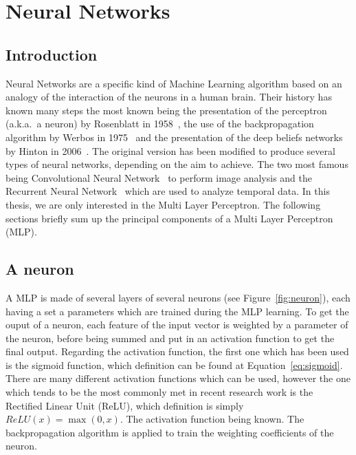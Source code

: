 \documentclass[a4paper]{report}
\begin{document}
\section{Neural Networks}
\label{sec:nn}

\subsection{Introduction}

Neural Networks are a specific kind of Machine Learning algorithm based on an analogy of the interaction of the neurons in a human brain. Their history has known many steps the most known being the presentation of the perceptron (a.k.a.\ a neuron) by Rosenblatt in 1958~\cite{rosenblatt1958perceptron}, the use of the backpropagation algorithm by Werbos in 1975~\cite{werbos1974beyond} and the presentation of the deep beliefs networks by Hinton in 2006~\cite{hinton2006fast}. The original version has been modified to produce several types of neural networks, depending on the aim to achieve. The two most famous being Convolutional Neural Network~\cite{krizhevsky2012imagenet} to perform image analysis and the Recurrent Neural Network~\cite{mikolov2010recurrent} which are used to analyze temporal data. In this thesis, we are only interested in the Multi Layer Perceptron. The following sections briefly sum up the principal components of a Multi Layer Perceptron (MLP). 

\subsection{A neuron}

A MLP is made of several layers of several neurons (see Figure~\ref{fig:neuron}), each having a set a parameters which are trained during the MLP learning. To get the ouput of a neuron, each feature of the input vector is weighted by a parameter of the neuron, before being summed and put in an activation function to get the final output. Regarding the activation function, the first one which has been used is the sigmoid function, which definition can be found at Equation~\ref{eq:sigmoid}. There are many different activation functions which can be used, however the one which tends to be the most commonly met in recent research work is the Rectified Linear Unit (ReLU), which definition is simply $ReLU(x) = \max(0, x)$. The activation function being known. The backpropagation algorithm is applied to train the weighting coefficients of the neuron.
\end{document}
